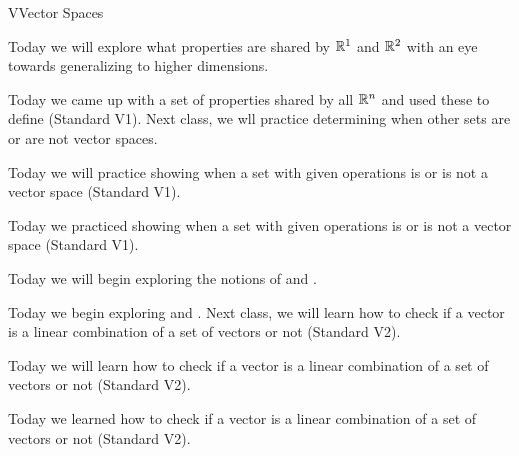 \begin{module}{V}{Vector Spaces}
 






\newModuleSection
\begin{goals}
Today we will explore what properties are shared by \(\mathbb{R}^1\) and \(\mathbb{R}^2\) with an eye towards generalizing to higher dimensions.
\end{goals}
\begin{summary}
Today we came up with a set of properties shared by all \(\mathbb{R}^n\) and used these to define  (Standard V1). Next class, we wll practice determining  when other sets are or are not vector spaces.
\end{summary}

\newModuleSection
\begin{goals}
Today we will practice showing when a set with given operations is or is not a vector space (Standard V1).
\end{goals}
\begin{summary}
Today we practiced showing when a set with given operations is or is not a vector space (Standard V1).
\end{summary}

\newModuleSection
\begin{goals}
Today we will begin exploring the notions of  and .
\end{goals}
\begin{summary}
Today we begin exploring  and .
\vfill
Next class, we will learn how to check if a vector is a linear combination of a set of vectors or not (Standard V2).
\end{summary}

\newModuleSection
\begin{goals}
Today we will learn how to check if a vector is a linear combination of a set of vectors or not (Standard V2).
\end{goals}
\begin{summary}
Today we learned how to check if a vector is a linear combination of a set of vectors or not (Standard V2).
\end{summary}


\end{module}
